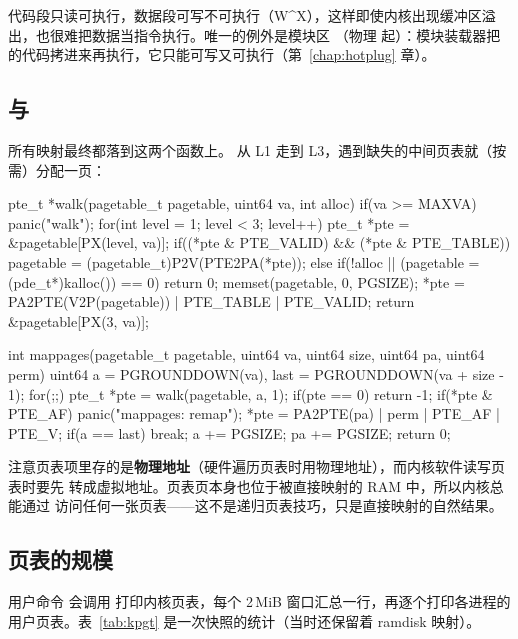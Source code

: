代码段只读可执行，数据段可写不可执行（W\^{}X），这样即使内核出现缓冲区溢出，也很难把数据当指令执行。唯一的例外是模块区 （物理  起）：模块装载器把  的代码拷进来再执行，它只能可写又可执行（第~\ref{chap:hotplug} 章）。

\subsection{ 与 }
\label{sec:walk-mappages}

所有映射最终都落到这两个函数上。 从 L1 走到 L3，遇到缺失的中间页表就（按需）分配一页：

\begin{ccode}
pte_t *walk(pagetable_t pagetable, uint64 va, int alloc) {
  if(va >= MAXVA) panic("walk");
  for(int level = 1; level < 3; level++) {
    pte_t *pte = &pagetable[PX(level, va)];
    if((*pte & PTE_VALID) && (*pte & PTE_TABLE)) {
      pagetable = (pagetable_t)P2V(PTE2PA(*pte));
    } else {
      if(!alloc || (pagetable = (pde_t*)kalloc()) == 0)
        return 0;
      memset(pagetable, 0, PGSIZE);
      *pte = PA2PTE(V2P(pagetable)) | PTE_TABLE | PTE_VALID;
    }
  }
  return &pagetable[PX(3, va)];
}

int mappages(pagetable_t pagetable, uint64 va, uint64 size, uint64 pa, uint64 perm) {
  uint64 a = PGROUNDDOWN(va), last = PGROUNDDOWN(va + size - 1);
  for(;;){
    pte_t *pte = walk(pagetable, a, 1);
    if(pte == 0) return -1;
    if(*pte & PTE_AF) panic("mappages: remap");
    *pte = PA2PTE(pa) | perm | PTE_AF | PTE_V;
    if(a == last) break;
    a += PGSIZE; pa += PGSIZE;
  }
  return 0;
}
\end{ccode}

注意页表项里存的是\textbf{物理地址}（硬件遍历页表时用物理地址），而内核软件读写页表时要先  转成虚拟地址。页表页本身也位于被直接映射的 RAM 中，所以内核总能通过  访问任何一张页表——这不是递归页表技巧，只是直接映射的自然结果。

\subsection{页表的规模}

用户命令  会调用  打印内核页表，每个 2\,MiB 窗口汇总一行，再逐个打印各进程的用户页表。表~\ref{tab:kpgt} 是一次快照的统计（当时还保留着 ramdisk 映射）。

